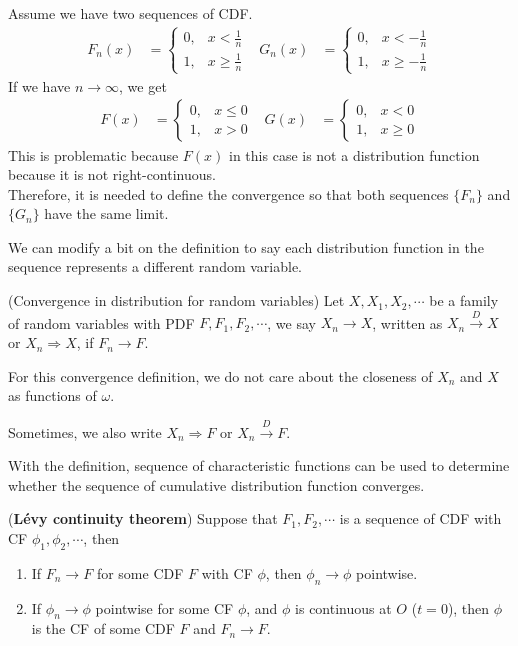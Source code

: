 \documentclass{huhtakm-template-book}
\begin{document}
\begin{eg}
	Assume we have two sequences of CDF.
	\begin{align*}
		F_{n}(x)&=\begin{cases}
			0, &x<\frac{1}{n}\\
			1, & x\geq\frac{1}{n}
		\end{cases} & G_{n}(x)&=\begin{cases}
			0, &x<-\frac{1}{n}\\
			1, & x\geq-\frac{1}{n}
		\end{cases}
	\end{align*}
	If we have $n\to\infty$, we get
	\begin{align*}
		F(x)&=\begin{cases}
			0, &x\leq 0\\
			1, &x>0
		\end{cases} & G(x)&=\begin{cases}
			0, &x<0\\
			1, &x\geq 0
		\end{cases}
	\end{align*}
	This is problematic because $F(x)$ in this case is not a distribution function because it is not right-continuous.\\
	Therefore, it is needed to define the convergence so that both sequences $\{F_{n}\}$ and $\{G_{n}\}$ have the same limit.
\end{eg}
We can modify a bit on the definition to say each distribution function in the sequence represents a different random variable.
\begin{defn}(Convergence in distribution for random variables)
	Let $X,X_{1},X_{2},\cdots$ be a family of random variables with PDF $F,F_{1},F_{2},\cdots$, we say $X_{n}\to X$, written as $X_{n}\xrightarrow{D}X$ or $X_{n}\Rightarrow X$, if $F_{n}\to F$.
\end{defn}
\begin{rem}
	For this convergence definition, we do not care about the closeness of $X_{n}$ and $X$ as functions of $\omega$.
\end{rem}
\begin{rem}
	Sometimes, we also write $X_{n}\Rightarrow F$ or $X_{n}\xrightarrow{D}F$.
\end{rem}
With the definition, sequence of characteristic functions can be used to determine whether the sequence of cumulative distribution function converges.
\begin{thm}(\textbf{L\'evy continuity theorem})
	Suppose that $F_{1},F_{2},\cdots$ is a sequence of CDF with CF $\phi_{1},\phi_{2},\cdots$, then
	\begin{enumerate}
		\item If $F_{n}\to F$ for some CDF $F$ with CF $\phi$, then $\phi_{n}\to\phi$ pointwise.
		\item If $\phi_{n}\to\phi$ pointwise for some CF $\phi$, and $\phi$ is continuous at $O$ ($t=0$), then $\phi$ is the CF of some CDF $F$ and $F_{n}\to F$.
	\end{enumerate}
\end{thm}
\end{document}
